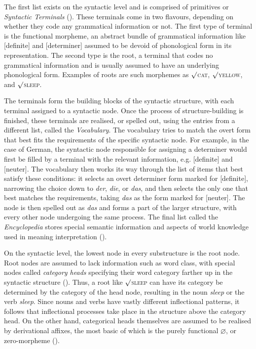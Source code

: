 The first list exists on the syntactic level and is comprised of primitives or \textit{Syntactic Terminals} (\cite{Embick+2015}). These terminals come in two flavours, depending on whether they code any grammatical information or not. The first type of terminal is the functional morpheme, an abstract bundle of grammatical information like [definite] and [determiner] assumed to be devoid of phonological form in its representation. The second type is the root, a terminal that codes no grammatical information and is usually assumed to have an underlying phonological form. Examples of roots are such morphemes as $\surd$\textsc{cat}, $\surd$\textsc{yellow}, and $\surd$\textsc{sleep}.

The terminals form the building blocks of the syntactic structure, with each terminal assigned to a syntactic node. 
Once the process of structure-building is finished, these terminals are realised, or spelled out, using the entries from a different list, called the \textit{Vocabulary}. The vocabulary tries to match the overt form that best fits the requirements of the specific syntactic node. For example, in the case of German, the syntactic node responsible for assigning a determiner would first be filled by a terminal with the relevant information, e.g. [definite] and [neuter]. The vocabulary then works its way through the list of items that best satisfy these conditions: it selects an overt determiner form marked for [definite], narrowing the choice down to \textit{der}, \textit{die}, or \textit{das}, and then selects the only one that best matches the requirements, taking \textit{das} as the form marked for [neuter]. The node is then spelled out as \textit{das} and forms a part of the larger structure, with every other node undergoing the same process. The final list called the \textit{Encyclopedia} stores special semantic information and aspects of world knowledge used in meaning interpretation (\cite{Embick+2015}). 

On the syntactic level, the lowest node in every substructure is the root node. Root nodes are assumed to lack information such as word class, with special nodes called \textit{category heads} specifying their word category farther up in the syntactic structure (\cite{Embick+2015}). Thus, a root like $\surd$\textsc{sleep} can have its category be determined by the category of the head node, resulting in the noun \textit{sleep} or the verb \textit{sleep}. Since nouns and verbs have vastly different inflectional patterns, it follows that inflectional processes take place in the structure above the category head. On the other hand, categorical heads themselves are assumed to be realised by derivational affixes, the most basic of which is the purely functional $\varnothing$, or zero-morpheme (\cite{Embick+2015}). 

